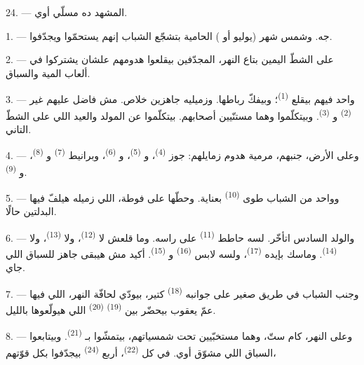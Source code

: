 24. --- المشهد ده مسلّي أوي.

\VUsaut{4.0mm}
\VUsaut{3.0mm}

\VUsaut{2.4mm}

\VUsaut{3.0mm}

1. ---  جه. وشمس شهر  (يوليو أو )
الحامية بتشجّع الشباب إنهم يستحمّوا ويجدّفوا.

2. --- على الشطّ اليمين بتاع النهر، المجدّفين بيقلعوا هدومهم علشان يشتركوا في
ألعاب المية والسباق.

3. --- واحد فيهم بيقلع  \textsuperscript{(1)}؛ وبيفكّ رباطها. وزميليه
جاهزين خلاص. مش فاضل عليهم غير  \textsuperscript{(2)}
و \textsuperscript{(3)}. وبيتكلّموا وهما مستنّيين أصحابهم. بيتكلّموا
عن المولد والعيد اللي على الشطّ التاني.

4. --- وعلى الأرض، جنبهم، مرمية هدوم زمايلهم: جوز 
\textsuperscript{(4)}، و \textsuperscript{(5)}، و
\textsuperscript{(6)}، وبرانيط  \textsuperscript{(7)} و
\textsuperscript{(8)}، و \textsuperscript{(9)}.

5. --- وواحد من الشباب طوى  \textsuperscript{(10)} بعناية. وحطّها على
فوطة، اللي زميله هيلفّ فيها البدلتين حالًا.

6. --- والولد السادس اتأخّر. لسه حاطط  \textsuperscript{(11)} على
راسه. وما قلعش لا  \textsuperscript{(12)}، ولا 
\textsuperscript{(13)}، ولا  \textsuperscript{(14)}. وماسك بإيده
 \textsuperscript{(17)}، ولسه لابس  \textsuperscript{(16)}
و \textsuperscript{(15)}. أكيد مش هيبقى جاهز للسباق اللي جاي.

7. --- وجنب الشباب في طريق صغير على جوانبه  \textsuperscript{(18)} كتير،
بيودّي لحافّة النهر، اللي فيها عمّ يعقوب بيحضّر بين 
\textsuperscript{(19)}  \textsuperscript{(20)} اللي هيولّعوها
بالليل.

\VUsaut{4.4mm}
\VUsaut{3.4mm}

8. --- وعلى النهر، كام ستّ، وهما مستخبّيين تحت شمسياتهم، بيتمشّوا
بـ \textsuperscript{(21)}. وبيتابعوا السباق اللي مشوّق أوي. في كل
 \textsuperscript{(22)}، أربع  \textsuperscript{(24)} بيجدّفوا
بكل قوّتهم،

